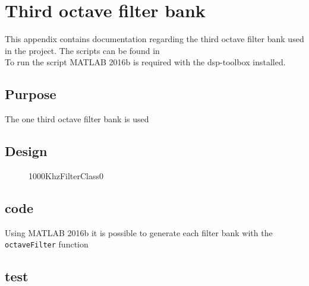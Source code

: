 \section{Third octave filter bank} {\label{sec:OctaveBank}}

This appendix contains documentation regarding the third octave filter bank used in the project. The scripts can be found in 
\\
To run the script MATLAB 2016b is required with the dsp-toolbox installed. 

\subsection{Purpose}

The one third octave filter bank is used


\subsection{Design}

\begin{figure}[H]
	\centering
	
	\caption{1000KhzFilterClass0}
	\label{fig:1000KhzFilterClass0}
\end{figure}

\subsection{code}

Using MATLAB 2016b it is possible to generate each filter bank with the \verb|octaveFilter| function


\subsection{test}

